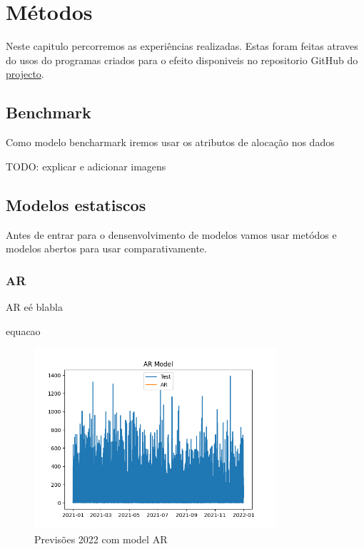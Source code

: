 \chapter{Métodos}

Neste capitulo percorremos as experiências realizadas. Estas foram feitas atraves do usos do programas criados para o efeito disponiveis no repositorio GitHub do \href{https://github.com/JotaFan/renewable-generation-into-reserve-markets}{projecto}.

\section{Benchmark}

Como modelo bencharmark iremos usar os atributos de alocação nos dados

TODO: explicar e adicionar imagens


\section{Modelos estatiscos  \label{se:dados_estudo}}

Antes de entrar para o densenvolvimento de modelos vamos usar metódos e modelos abertos para usar comparativamente.

\subsection{AR}

AR eé blabla

equacao

\begin{figure}[H]
    \centering
    \includegraphics[width=0.8\textwidth]{../plots/AR_model.png}
    \caption{Previsões 2022 com model AR}
    \label{fig:AR_model}
\end{figure}
  



